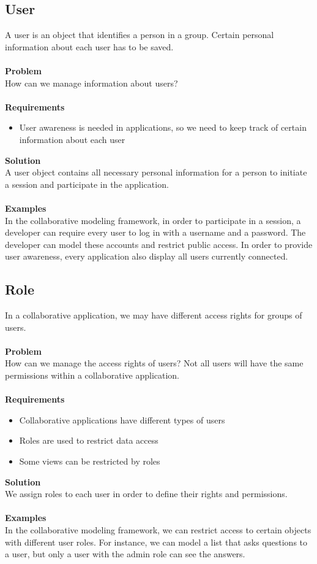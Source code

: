 \subsection{User}

A user is an object that identifies a person in a group. Certain personal information about each user has to be saved. 
\\ \\
\textbf{Problem}
\\
How can we manage information about users?
\\ \\
\textbf{Requirements}
\begin{itemize}
\item{User awareness is needed in applications, so we need to keep track of certain information about each user}
\end{itemize}
\textbf{Solution}
\\
A user object contains all necessary personal information for a person to initiate a session and participate in the application.
\\ \\
\textbf{Examples}
\\
In the collaborative modeling framework, in order to participate in a session, a developer can require every user to log in with a username and a password. The developer can model these accounts and restrict public access. In order to provide user awareness, every application also display all users currently connected.

\subsection{Role}

In a collaborative application, we may have different access rights for groups of users.
\\ \\
\textbf{Problem}
\\
How can we manage the access rights of users? Not all users will have the same permissions within a collaborative application.
\\ \\
\textbf{Requirements}
\begin{itemize}
\item{Collaborative applications have different types of users}
\item{Roles are used to restrict data access}
\item{Some views can be restricted by roles}
\end{itemize}
\textbf{Solution}
\\
We assign roles to each user in order to define their rights and permissions.
\\ \\
\textbf{Examples}
\\
In the collaborative modeling framework, we can restrict access to certain objects with different user roles. For instance, we can model a list that asks questions to a user, but only a user with the admin role can see the answers. 

